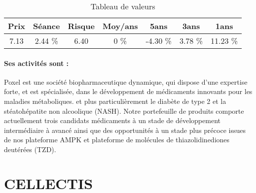 \documentclass[11pt,a4paper]{report}%
\begin{document}
\begin{table}[H]
  \centering
    \begin{tabular}{|c|c|c|c|c|c|c|}
    \hline
    Prix & Séance & Risque  & Moy/ans & 5ans & 3ans & 1ans \\
    \hline
    7.13 &    2.44 \%    & 6.40 & 0 \% & -4.30 \% & 3.78 \% & 11.23 \% \\
    \hline
    \end{tabular}%
        \label{tab:table_POXEL}%
      \caption{Tableau de valeurs}
\end{table}%

\paragraph{Ses activités sont : } Poxel est une société biopharmaceutique dynamique, qui dispose d’une expertise forte, et est spécialisée, dans le développement de médicaments innovants pour les maladies métaboliques. et plus particulièrement le diabète de type 2 et la stéatohépatite non alcoolique (NASH). Notre portefeuille de produits comporte actuellement trois candidats médicaments à un stade de développement intermédiaire à avancé ainsi que des opportunités à un stade plus précoce issues de nos plateforme AMPK et plateforme de molécules de thiazolidinediones deutérées (TZD). 
    
    \newpage

\section{CELLECTIS}
\end{document}
